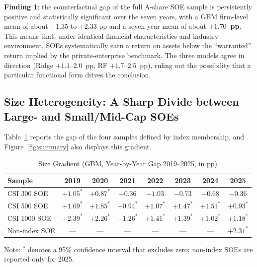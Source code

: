 \documentclass[11pt,a4paper]{article}
\begin{document}
\medskip
\noindent\textbf{Finding 1}: the counterfactual gap of the full A-share SOE sample is persistently positive and statistically significant over the seven years, with a GBM firm-level mean of about $+1.35$ to $+2.33$ pp and a seven-year mean of about \textbf{$+1.70$~pp}. This means that, under identical financial characteristics and industry environment, SOEs systematically earn a return on assets below the ``warranted'' return implied by the private-enterprise benchmark. The three models agree in direction (Ridge $+1.1$--$2.0$~pp, RF $+1.7$--$2.5$~pp), ruling out the possibility that a particular functional form drives the conclusion.

\subsection{Size Heterogeneity: A Sharp Divide between Large- and Small/Mid-Cap SOEs}

Table~\ref{tab:size_gradient} reports the gap of the four samples defined by index membership, and Figure~\ref{fig:summary} also displays this gradient.

\begin{table}[htbp]
\centering
\caption{Size Gradient (GBM, Year-by-Year Gap 2019--2025, in pp)}
\label{tab:size_gradient}
\begin{threeparttable}
\small
\begin{tabular}{lccccccc}
\toprule
Sample & 2019 & 2020 & 2021 & 2022 & 2023 & 2024 & 2025 \\
\midrule
CSI 300 SOE & $+1.05^{*}$ & $+0.87^{*}$ & $-0.36$ & $-1.03$ & $-0.73$ & $-0.68$ & $-0.36$ \\
CSI 500 SOE & $+1.69^{*}$ & $+1.85^{*}$ & $+0.94^{*}$ & $+1.07^{*}$ & $+1.47^{*}$ & $+1.51^{*}$ & $+0.93^{*}$ \\
CSI 1000 SOE & $+2.39^{*}$ & $+2.26^{*}$ & $+1.26^{*}$ & $+1.41^{*}$ & $+1.39^{*}$ & $+1.02^{*}$ & $+1.18^{*}$ \\
Non-index SOE & --- & --- & --- & --- & --- & --- & $+2.31^{*}$ \\
\bottomrule
\end{tabular}
\begin{tablenotes}
\footnotesize\raggedright
\item Note: $^{*}$ denotes a 95\% confidence interval that excludes zero; non-index SOEs are reported only for 2025.
\end{tablenotes}
\end{threeparttable}
\end{table}
\end{document}
